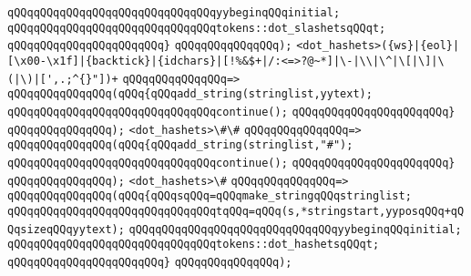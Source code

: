 \verb|qQQqqQQqqQQqqQQqqQQqqQQqqQQqqQQqyybeginqQQqinitial;|\newline
\verb|qQQqqQQqqQQqqQQqqQQqqQQqqQQqqQQqtokens::dot_slashetsqQQqt;|\newline
\verb|qQQqqQQqqQQqqQQqqQQqqQQq}|\newline
\verb|qQQqqQQqqQQqqQQq);|\newline
\newline
\newline
\newline
\verb|<dot_hashets>({ws}|\verb#|{eol}|[\x00-\x1f]|{backtick}|{idchars}|[!%&$+|/:<=>?@~*]|\-|\\|\^|\[|\]|\(|\)|[',.;^{}"])+#\newline
\verb|qQQqqQQqqQQqqQQq=>|\newline
\verb|qQQqqQQqqQQqqQQq(qQQq{qQQqadd_string(stringlist,yytext);|\newline
\verb|qQQqqQQqqQQqqQQqqQQqqQQqqQQqqQQqcontinue();|\newline
\verb|qQQqqQQqqQQqqQQqqQQqqQQq}|\newline
\verb|qQQqqQQqqQQqqQQq);|\newline
\newline
\verb|<dot_hashets>\#\#|\newline
\verb|qQQqqQQqqQQqqQQq=>|\newline
\verb|qQQqqQQqqQQqqQQq(qQQq{qQQqadd_string(stringlist,"#");|\newline
\verb|qQQqqQQqqQQqqQQqqQQqqQQqqQQqqQQqcontinue();|\newline
\verb|qQQqqQQqqQQqqQQqqQQqqQQq}|\newline
\verb|qQQqqQQqqQQqqQQq);|\newline
\newline
\verb|<dot_hashets>\#|\newline
\verb|qQQqqQQqqQQqqQQq=>|\newline
\verb|qQQqqQQqqQQqqQQq(qQQq{qQQqsqQQq=qQQqmake_stringqQQqstringlist;|\newline
\verb|qQQqqQQqqQQqqQQqqQQqqQQqqQQqqQQqtqQQq=qQQq(s,*stringstart,yyposqQQq+qQQqsizeqQQqyytext);|\newline
\verb|qQQqqQQqqQQqqQQqqQQqqQQqqQQqqQQqyybeginqQQqinitial;|\newline
\verb|qQQqqQQqqQQqqQQqqQQqqQQqqQQqqQQqtokens::dot_hashetsqQQqt;|\newline
\verb|qQQqqQQqqQQqqQQqqQQqqQQq}|\newline
\verb|qQQqqQQqqQQqqQQq);|\newline
\newline
